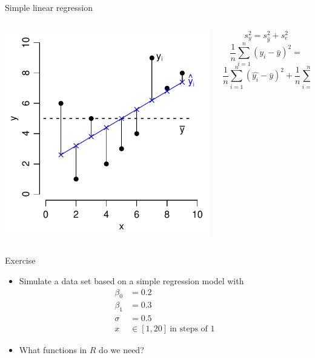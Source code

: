 \documentclass[aspectratio=169]{beamer}
\begin{document}
\begin{frame}{Simple linear regression}
\begin{columns}[c]
\begin{column}{6cm}
  \includegraphics[scale=.7]{../figures/obs_pred}
\end{column}
%
\begin{column}{5cm}
{\small
\[
  s_y^2 = s_{\hat y}^2 + s_e^2
\]
\[
  \frac{1}{n} \sum_{i=1}^n (y_i - \bar{y})^2 =
\]
\[
  \frac{1}{n} \sum_{i=1}^n (\hat{y_i} - \bar{y})^2 +
  \frac{1}{n} \sum_{i=1}^n (y_i - \hat{y_i})^2
\]
}
\end{column}
\end{columns}
\vfill
\end{frame}

\begin{frame}{}
  \begin{block}{Exercise}
    \begin{itemize}
      \item Simulate a data set based on a simple regression model with
        \begin{align*}
          \beta_0 & = 0.2\\
          \beta_1 & = 0.3\\
          \sigma & = 0.5\\
          x & \in [1, 20]~\text{in steps of 1}
        \end{align*}
        \vspace{-.5cm}
      \item What functions in $R$ do we need?
    \end{itemize}
  \end{block}
\end{frame}
\end{document}
